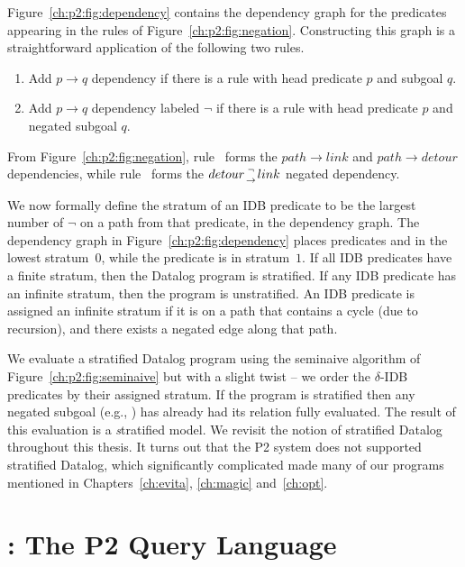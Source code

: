 Figure~\ref{ch:p2:fig:dependency} contains the dependency graph for the predicates
appearing in the rules of Figure~\ref{ch:p2:fig:negation}. Constructing this graph
is a straightforward application of the following two rules.
\begin{enumerate}
  \ssp
  \item Add $p \rightarrow q$ dependency if there is a rule with head predicate $p$ and subgoal $q$.
  \item Add $p \rightarrow q$ dependency labeled $\neg$ if there is a rule with head predicate $p$ and negated subgoal $q$.
\end{enumerate}
From Figure~\ref{ch:p2:fig:negation}, rule~ forms the $path \rightarrow
link$ and $path \rightarrow detour$ dependencies, while rule~ forms the
$detour {\neg \atop \rightarrow} link$ negated dependency. 

We now formally define the stratum of an IDB predicate to be the largest number
of $\neg$ on a path from that predicate, in the dependency graph. The dependency
graph in Figure~\ref{ch:p2:fig:dependency} places predicates  and 
in the lowest stratum~$0$, while the  predicate is in stratum~$1$. If all
IDB predicates have a finite stratum, then the Datalog program is stratified. If any
IDB predicate has an infinite stratum, then the program is unstratified. An IDB
predicate is assigned an infinite stratum if it is on a path that contains a cycle 
(due to recursion), and there exists a negated edge along that path. 

We evaluate a stratified Datalog program using the seminaive algorithm of
Figure~\ref{ch:p2:fig:seminaive} but with a slight twist -- we order the
$\delta$-IDB predicates by their assigned stratum.  If the program is
stratified then any negated subgoal (e.g., ) has already had its
relation fully evaluated.  The result of this evaluation is a {\emph stratified
model}. We revisit the notion of stratified Datalog throughout this thesis. It turns
out that the P2 system does not supported stratified Datalog, which significantly
complicated made many of our \OVERLOG programs mentioned in Chapters~\ref{ch:evita}, 
\ref{ch:magic} and~\ref{ch:opt}.


\section{\OVERLOG: The P2 Query Language}
\label{ch:p2:sec:overlog}

